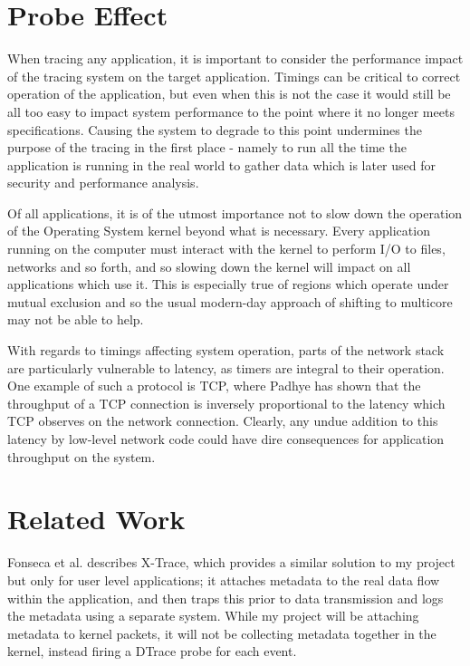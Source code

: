 \documentclass[a4paper,12pt,twoside,openright]{report}
\begin{document}
	\section{Probe Effect}	
	When tracing any application, it is important to consider the performance impact of the tracing system on the target application. Timings can be critical to correct operation of the application, but even when this is not the case it would still be all too easy to impact system performance to the point where it no longer meets specifications. Causing the system to degrade to this point undermines the purpose of the tracing in the first place - namely to run all the time the application is running in the real world to gather data which is later used for security and performance analysis.
	
	Of all applications, it is of the utmost importance not to slow down the operation of the Operating System kernel beyond what is necessary. Every application running on the computer must interact with the kernel to perform I/O to files, networks and so forth, and so slowing down the kernel will impact on all applications which use it. This is especially true of regions which operate under mutual exclusion and so the usual modern-day approach of shifting to multicore may not be able to help.
	
	With regards to timings affecting system operation, parts of the network stack are particularly vulnerable to latency, as timers are integral to their operation. One example of such a protocol is TCP, where Padhye\cite{Padhye-TCP} has shown that the throughput of a TCP connection is inversely proportional to the latency which TCP observes on the network connection. Clearly, any undue addition to this latency by low-level network code could have dire consequences for application throughput on the system.
	
	\section{Related Work}
	
	Fonseca et al.\cite{X-Trace} describes X-Trace, which provides a similar solution to my project but only for user level applications; it attaches metadata to the real data flow within the application, and then traps this prior to data transmission and logs the metadata using a separate system. While my project will be attaching metadata to kernel packets, it will not be collecting metadata together in the kernel, instead firing a DTrace probe for each event.
	
\end{document}

